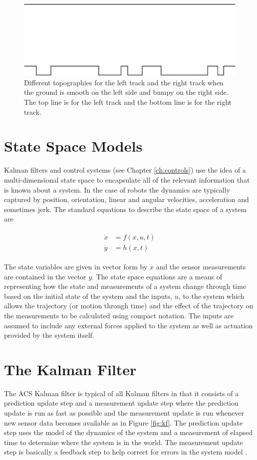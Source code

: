 \begin{figure}[ht!]
	\centering
	\includegraphics[width=.5\textwidth]{images/topography}
	\caption{Different topographies for the left track and the right track when the ground is smooth on the left side and bumpy on the right side. The top line is for the left track and the bottom line is for the right track.}
	\label{fig:topography}
\end{figure}

\section{State Space Models}
Kalman filters and control systems (see Chapter \ref{ch:controls}) use the idea of a multi-dimensional state space to encapsulate all of the relevant information that is known about a system. In the case of robots the dynamics are typically captured by position, orientation, linear and angular velocities, acceleration and sometimes jerk. The standard equations to describe the state space of a system are

\begin{align}
\label{eq:statespace}
\begin{split}
\dot{x} &= f(x,u,t) \\
\dot{y} &= h(x,t)
\end{split}
\end{align}

The state variables are given in vector form by $x$ and the sensor measurements are contained in the vector $y$. The state space equations are a means of representing how the state and measurements of a system change through time based on the initial state of the system and the inputs, $u$, to the system which allows the trajectory (or motion through time) and the effect of the trajectory on the measurements to be calculated using compact notation. The inputs are assumed to include any external forces applied to the system as well as actuation provided by the system itself.

\section{The Kalman Filter}
The ACS Kalman filter is typical of all Kalman filters in that it consists of a prediction update step and a measurement update step where the prediction update is run as fast as possible and the measurement update is run whenever new sensor data becomes available as in Figure \ref{fig:kf}. The prediction update step uses the model of the dynamics of the system and a measurement of elapsed time to determine where the system is in the world. The measurement update step is basically a feedback step to help correct for errors in the system model \cite{Kelly_1994_338}.

